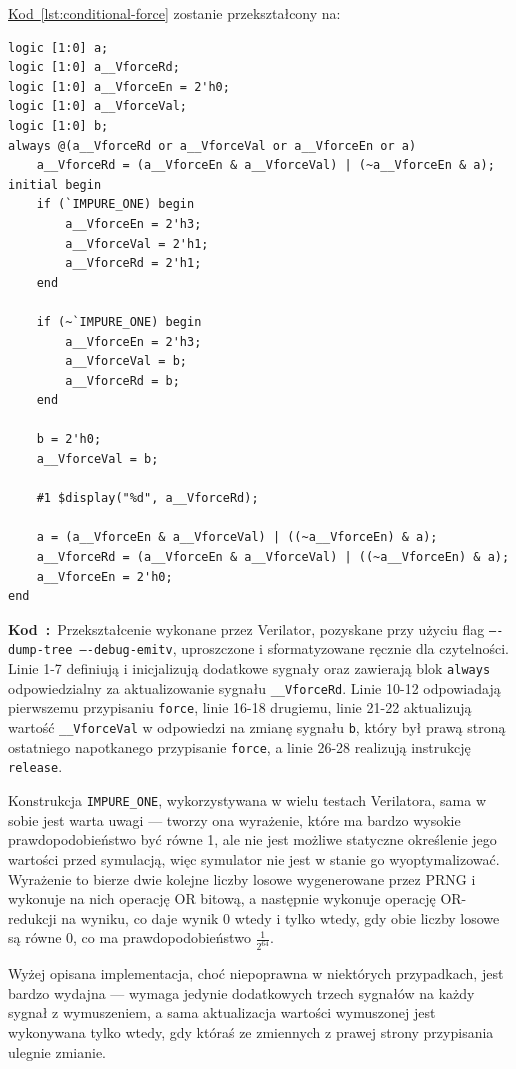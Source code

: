 \documentclass[shortabstract, inz]{iithesis}
\newcounter{kod}[chapter]
\renewcommand{\thekod}{\thechapter\arabic{kod}}
\newcommand{\codecaption}[2]{%
  \par\refstepcounter{kod}\label{#1}%
  \noindent\textbf{Kod~\thekod:}~#2\par
  \vspace*{1.0\baselineskip}%
}
\newcommand{\coderef}[1]{\hyperref[#1]{Kod~\ref*{#1}}}
\begin{document}
\coderef{lst:conditional-force} zostanie przekształcony na:
\begin{verbatim}
logic [1:0] a;
logic [1:0] a__VforceRd;
logic [1:0] a__VforceEn = 2'h0;
logic [1:0] a__VforceVal;
logic [1:0] b;
always @(a__VforceRd or a__VforceVal or a__VforceEn or a)
    a__VforceRd = (a__VforceEn & a__VforceVal) | (~a__VforceEn & a);
initial begin
    if (`IMPURE_ONE) begin
        a__VforceEn = 2'h3;
        a__VforceVal = 2'h1;
        a__VforceRd = 2'h1;
    end

    if (~`IMPURE_ONE) begin
        a__VforceEn = 2'h3;
        a__VforceVal = b;
        a__VforceRd = b;
    end

    b = 2'h0;
    a__VforceVal = b;

    #1 $display("%d", a__VforceRd);

    a = (a__VforceEn & a__VforceVal) | ((~a__VforceEn) & a);
    a__VforceRd = (a__VforceEn & a__VforceVal) | ((~a__VforceEn) & a);
    a__VforceEn = 2'h0;
end
\end{verbatim}
\codecaption{lst:force-current}{Przekształcenie wykonane przez Verilator, pozyskane przy użyciu flag \texttt{----dump-tree ----debug-emitv}, uproszczone i sformatyzowane ręcznie dla czytelności. Linie 1-7 definiują i inicjalizują dodatkowe sygnały oraz zawierają blok \texttt{always} odpowiedzialny za aktualizowanie sygnału \texttt{\_\_VforceRd}. Linie 10-12 odpowiadają pierwszemu przypisaniu \texttt{force}, linie 16-18 drugiemu, linie 21-22 aktualizują wartość \texttt{\_\_VforceVal} w odpowiedzi na zmianę sygnału \texttt{b}, który był prawą stroną ostatniego napotkanego przypisanie \texttt{force}, a linie 26-28 realizują instrukcję \texttt{release}.}

Konstrukcja \texttt{IMPURE\_ONE}, wykorzystywana w wielu testach Verilatora, sama w sobie jest warta uwagi --- tworzy ona wyrażenie, które ma bardzo wysokie prawdopodobieństwo być równe 1, ale nie jest możliwe statyczne określenie jego wartości przed symulacją, więc symulator nie jest w stanie go wyoptymalizować. Wyrażenie to bierze dwie kolejne liczby losowe wygenerowane przez PRNG i wykonuje na nich operację OR bitową, a następnie wykonuje operację OR-redukcji na wyniku, co daje wynik 0 wtedy i tylko wtedy, gdy obie liczby losowe są równe 0, co ma prawdopodobieństwo $\frac{1}{2^{64}}$.

Wyżej opisana implementacja, choć niepoprawna w niektórych przypadkach, jest bardzo wydajna --- wymaga jedynie dodatkowych trzech sygnałów na każdy sygnał z wymuszeniem, a sama aktualizacja wartości wymuszonej jest wykonywana tylko wtedy, gdy któraś ze zmiennych z prawej strony przypisania ulegnie zmianie.
\end{document}

